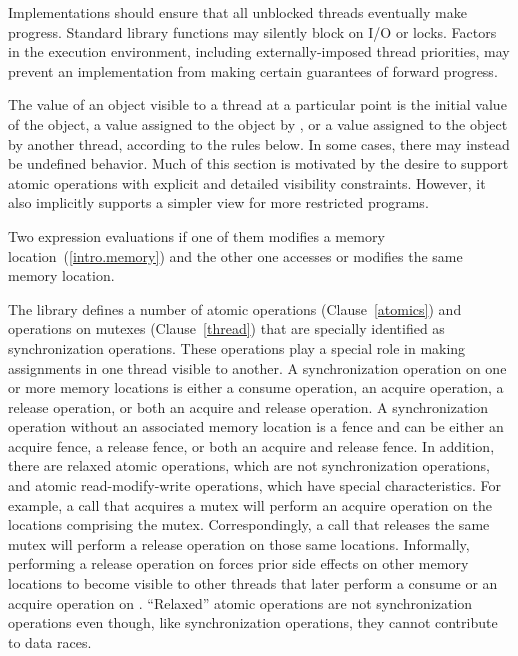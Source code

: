 \pnum
Implementations should ensure that all unblocked threads eventually make
progress. \enternote Standard library functions may silently block on I/O or
locks. Factors in the execution environment, including externally-imposed thread
priorities, may prevent an implementation from making certain guarantees of
forward progress. \exitnote

\pnum
The value of an object visible to a thread  at a particular point is the
initial value of the object, a value assigned to the object by , or a
value assigned to the object by another thread, according to the rules below.
\enternote In some cases, there may instead be undefined behavior. Much of this
section is motivated by the desire to support atomic operations with explicit
and detailed visibility constraints. However, it also implicitly supports a
simpler view for more restricted programs. \exitnote

\pnum
Two expression evaluations  if one of them modifies a memory
location~(\ref{intro.memory}) and the other one accesses or modifies the same
memory location.

\pnum
The library defines a number of atomic operations (Clause~\ref{atomics}) and
operations on mutexes (Clause~\ref{thread}) that are specially identified as
synchronization operations. These operations play a special role in making
assignments in one thread visible to another. A synchronization operation on one
or more memory locations is either a consume operation, an acquire operation, a
release operation, or both an acquire and release operation. A synchronization
operation without an associated memory location is a fence and can be either an
acquire fence, a release fence, or both an acquire and release fence. In
addition, there are relaxed atomic operations, which are not synchronization
operations, and atomic read-modify-write operations, which have special
characteristics. \enternote For example, a call that acquires a mutex will
perform an acquire operation on the locations comprising the mutex.
Correspondingly, a call that releases the same mutex will perform a release
operation on those same locations. Informally, performing a release operation on
 forces prior
%
side effects on other memory locations to become visible
to other threads that later perform a consume or an acquire operation on
. ``Relaxed'' atomic operations are not synchronization operations even
though, like synchronization operations, they cannot contribute to data races.
\exitnote

